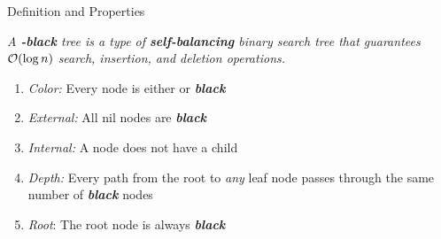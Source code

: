 \documentclass[aspectratio=169]{beamer}
\newcommand{\textib}[1]{\textit{\textbf{{#1}}}}
\newcommand{\red}{\textib{\color{red}{red }}}
\newcommand{\define}[1]{\begin{tcolorbox}[title={Definition}]\small{\textit{{#1}}}\end{tcolorbox}}
\begin{document}
\begin{frame}[fragile]{Definition and Properties}
    \define{
        A \textib{\color{red}{red}}\textib{-black} tree is a type of \textib{self-balancing} binary 
        search tree that guarantees ${\cal{O}}(\log n)$ search, insertion, and deletion operations.
    }
    \begin{minipage}{.45\textwidth}
        \begin{enumerate}[label=\textit{(\roman*)}]
            \item<0> \textit{Color:} Every node is either \red or \textib{black}
            \item<0> \textit{External:} All nil nodes are \textib{black}
            \item<0> \textit{Internal:} A \red node does not have a \red child
            \item<0> \textit{Depth:} Every path from the root to \textit{any} leaf node passes through
                the same number of \textib{black} nodes
            \item \textit{Root}: The root node is always \textib{black}
        \end{enumerate}
    \end{minipage}
    \hfill
    \begin{minipage}{.5\textwidth}
        \centering
    \end{minipage}
\end{frame}
\end{document}
